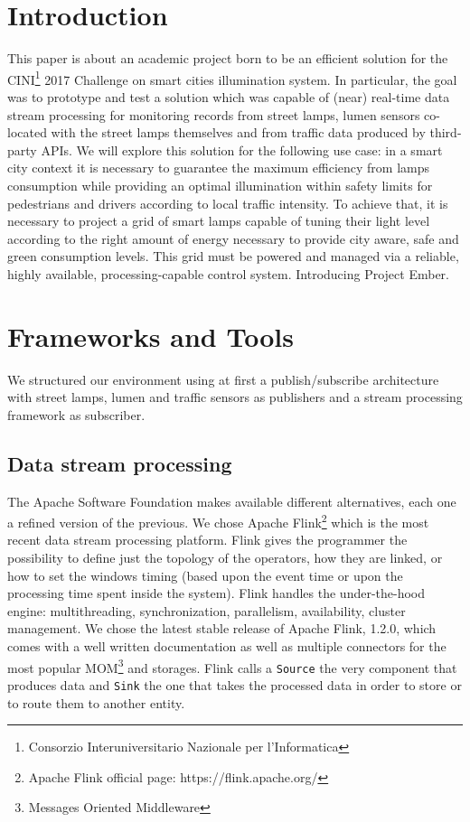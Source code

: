 \section{Introduction}
This paper is about an academic project born to be an efficient solution for the CINI\footnote{Consorzio Interuniversitario Nazionale per l'Informatica} 2017 Challenge on smart cities illumination system. In particular, the goal was to prototype and test a solution which was capable of (near) real-time data stream processing for monitoring records from street lamps, lumen sensors co-located with the street lamps themselves and from traffic data produced by third-party APIs. We will explore this solution for the following use case: in a smart city context it is necessary to guarantee the maximum efficiency from lamps consumption while providing an optimal illumination within safety limits for pedestrians and drivers according to local traffic intensity. To achieve that, it is necessary to project a grid of smart lamps capable of tuning their light level according to the right amount of energy necessary to provide city aware, safe and green consumption levels. This grid must be powered and managed via a reliable, highly available, processing-capable control system. Introducing Project Ember.

\section{Frameworks and Tools}
We structured our environment using at first a publish/subscribe architecture with street lamps, lumen and traffic sensors as publishers and a stream processing framework as subscriber. 

\subsection{Data stream processing}
The Apache Software Foundation makes available different alternatives, each one a refined version of the previous. We chose Apache Flink\footnote{Apache Flink official page: https://flink.apache.org/} which is the most recent data stream processing platform. Flink gives the programmer the possibility to define just the topology of the operators, how they are linked, or how to set the windows timing (based upon the event time or upon the processing time spent inside the system). Flink handles the under-the-hood engine: multithreading, synchronization, parallelism, availability, cluster management. We chose the latest stable release of Apache Flink, 1.2.0, which comes with a well written documentation as well as multiple connectors for the most popular MOM\footnote{Messages Oriented Middleware} and storages. Flink calls a \texttt{Source} the very component that produces data and \texttt{Sink} the one that takes the processed data in order to store or to route them to another entity.

